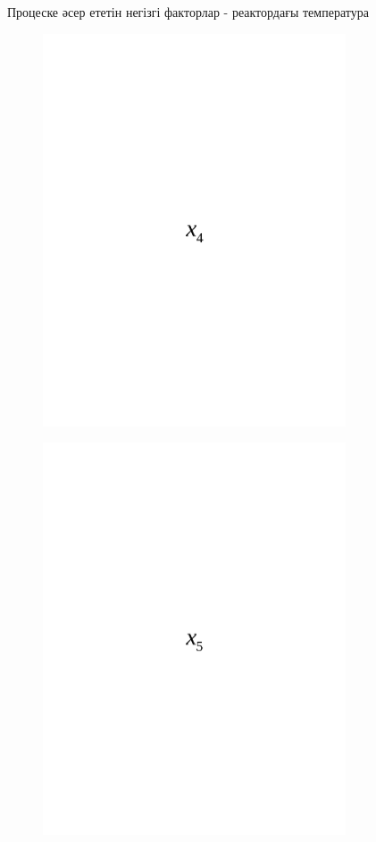 Процеске әсер ететін негізгі факторлар - реактордағы температура
\begin{figure}[H]
	\centering
	\includegraphics[width=0.8\textwidth]{media/ict/image90}
	\caption*{}
\end{figure}

\begin{figure}[H]
	\centering
	\includegraphics[width=0.8\textwidth]{media/ict/image91}
	\caption*{}
\end{figure}

